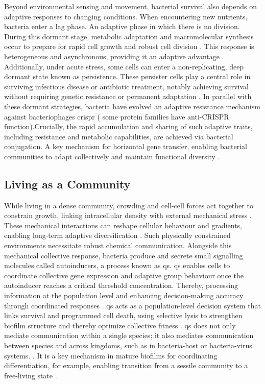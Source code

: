 Beyond environmental sensing and movement, bacterial survival also depends on adaptive
responses to changing conditions. When encountering new nutrients, bacteria enter a lag
phase. An adaptive phase in which there is no division. During this dormant stage,
metabolic adaptation and macromolecular synthesis occur to prepare for rapid cell growth
and robust cell division \cite{Bertrand2019}. This response is heterogeneous and
asynchronous, providing it an adaptive advantage \cite{Senkei2007}. Additionally, under
acute stress, some cells can enter a non-replicating, deep dormant state known as
persistence. These persister cells play a central role in surviving infectious disease or
antibiotic treatment, notably achieving survival without requiring genetic resistance or
permanent adaptation \cite{Wood2013, Lewis2006}.
In parallel with these dormant strategies, bacteria have evolved an adaptive resistance
mechanism against bacteriophages \ac{crispr} \cite{Duckworth2002, Barrangou2007}
(\cite{Borges2017} some protein families have anti-CRISPR function).Crucially, the rapid
accumulation and sharing of such adaptive traits, including resistance and metabolic
capabilities, are achieved via bacterial conjugation. A key mechanism for horizontal gene
transfer, enabling bacterial communities to adapt collectively and maintain functional
diversity \cite{Virolle2020, Kong2018}.

\subsection{Living as a Community}
While living in a dense community, crowding and cell-cell forces act together to
constrain growth, linking intracellular density with external mechanical stress
\cite{Alric2022}. These mechanical interactions can reshape cellular behaviour and
gradients, enabling long-term adaptive diversification \cite{Badyaev2025}. Such
physically constrained environments necessitate robust chemical communication. Alongside
this mechanical collective response, bacteria produce and secrete small signalling
molecules called autoinducers, a process known as \ac{qs}. \ac{qs} enables cells to
coordinate collective gene expression and adaptive group behaviour once the autoinducer
reaches a critical threshold concentration. Thereby, processing information at the
population level and enhancing decision-making accuracy through coordinated responses
\cite{Stephen2007, MorenoGmez2023}. \ac{qs} acts as a population-level decision system
that links survival and programmed cell death, using selective lysis to strengthen
biofilm structure and thereby optimize collective fitness \cite{Leung2015,
Senadheera2008, Dufour2013, Mashruwala2024}. \ac{qs} does not only mediate communication
within a single species; it also mediates communication between species and across
kingdoms, such as in bacteria-host or bacteria-virus systems. \cite{Hense2007, Boyer2009,
Liu2025}. It is a key mechanism in mature biofilms for coordinating differentiation, for
example, enabling transition from a sessile community to a free-living state \cite{Solano2014}.


